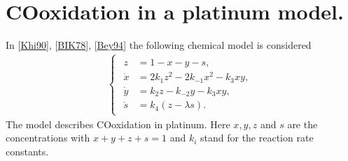 \documentclass[letterpaper,10pt,english]{jupyterBook}
\begin{document}
\chapter{CO\sphinxhyphen{}oxidation in a platinum model.}
\label{\detokenize{CO-oxidation:co-oxidation-in-a-platinum-model}}\label{\detokenize{CO-oxidation::doc}}
\sphinxAtStartPar
In {[}\hyperlink{cite.references:id10}{Khi90}{]}, {[}\hyperlink{cite.references:id11}{BIK78}{]},  {[}\hyperlink{cite.references:id9}{Bey94}{]} the following
chemical model is considered
\begin{equation*}
\begin{split}
\begin{cases}
\begin{aligned}
z &= 1 - x - y - s, \\
\dot x &= 2k_1z^2 - 2k_{-1}x^2 - k_3xy, \\
\dot y &= k_2z - k_{-2}y - k_3xy, \\
\dot s &= k_4(z - \lambda s).
\end{aligned}
\end{cases}
\end{split}
\end{equation*}
\sphinxAtStartPar
The model describes CO\sphinxhyphen{}oxidation in platinum.  Here \(x, y, z\) and \(s\) are the
concentrations with \(x + y + z + s = 1\) and \(k_i\) stand for the reaction rate
constants.
\end{document}
